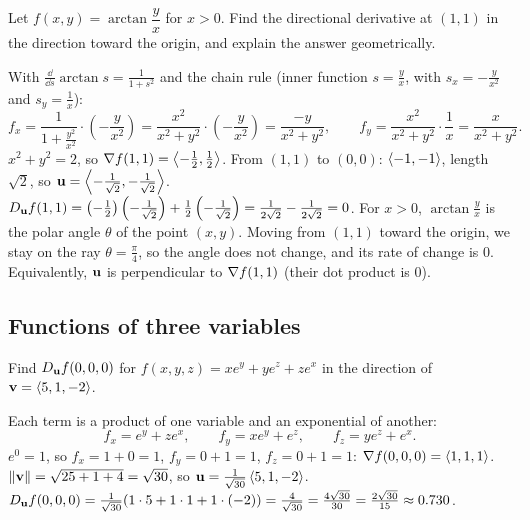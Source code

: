 \begin{problem}\label{prob:p8}
Let $f(x,y)=\arctan\dfrac yx$ for $x>0$. Find the directional derivative at
$(1,1)$ in the direction toward the origin, and explain the answer
geometrically.
\end{problem}
\begin{solution}
 With $\frac{\dd}{\dd s}\arctan s=\frac{1}{1+s^2}$ and the chain rule
(inner function $s=\frac yx$, with $s_x=-\frac{y}{x^2}$ and $s_y=\frac1x$):
\[
  f_x=\frac{1}{1+\frac{y^2}{x^2}}\cdot\left(-\frac{y}{x^2}\right)=\frac{x^2}{x^2+y^2}\cdot\left(-\frac{y}{x^2}\right)=\frac{-y}{x^2+y^2},\qquad
  f_y=\frac{x^2}{x^2+y^2}\cdot\frac1x=\frac{x}{x^2+y^2}.
\]
 $x^2+y^2=2$, so $\nabla f(1,1)=\left\langle -\frac12,\frac12 \right\rangle$.
 From $(1,1)$ to $(0,0)$: $\left\langle -1,-1 \right\rangle$, length $\sqrt2$,
so $\mathbf{u}=\left\langle -\frac{1}{\sqrt2},-\frac{1}{\sqrt2} \right\rangle$.
$D_{\mathbf{u}} f(1,1)=\left(-\frac12\right)\left(-\frac{1}{\sqrt2}\right)+\frac12\left(-\frac{1}{\sqrt2}\right)=\frac{1}{2\sqrt2}-\frac{1}{2\sqrt2}=0$.
 For $x>0$, $\arctan\frac yx$ is the polar angle $\theta$ of the point
$(x,y)$. Moving from $(1,1)$ toward the origin, we stay on the ray $\theta=\frac\pi4$, so the angle
does not change, and its rate of change is $0$. Equivalently, $\mathbf{u}$ is perpendicular to
$\nabla f(1,1)$ (their dot product is $0$).
\end{solution}

\subsection{Functions of three variables}

\begin{problem}\label{prob:p11}
Find $D_{\mathbf{u}} f(0,0,0)$ for $f(x,y,z)=xe^y+ye^z+ze^x$ in the direction of
$\mathbf{v}=\left\langle 5,1,-2 \right\rangle$.
\end{problem}
\begin{solution}
 Each term is a product of one variable and an exponential of another:
\[
  f_x=e^y+ze^x,\qquad f_y=xe^y+e^z,\qquad f_z=ye^z+e^x .
\]
 $e^0=1$, so $f_x=1+0=1$, $f_y=0+1=1$, $f_z=0+1=1$: $\nabla f(0,0,0)=\left\langle 1,1,1 \right\rangle$.
 $\lVert\mathbf{v}\rVert=\sqrt{25+1+4}=\sqrt{30}$, so $\mathbf{u}=\frac{1}{\sqrt{30}}\left\langle 5,1,-2 \right\rangle$.
$D_{\mathbf{u}} f(0,0,0)=\frac{1}{\sqrt{30}}(1\cdot5+1\cdot1+1\cdot(-2))=\frac{4}{\sqrt{30}}=\frac{4\sqrt{30}}{30}=\frac{2\sqrt{30}}{15}\approx0.730$.
\end{solution}

